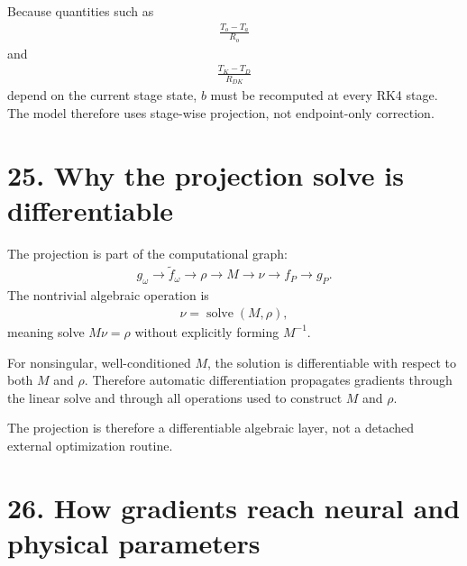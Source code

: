 \documentclass[11pt]{article}
\begin{document}
Because quantities such as
\begin{align}
\frac{T_o-T_a}{R_o}
\end{align}
and
\begin{align}
\frac{T_K-T_D}{R_{DK}}
\end{align}
depend on the current stage state, \(b\) must be recomputed at every RK4 stage. The model therefore uses stage-wise projection, not endpoint-only correction.

\section*{25. Why the projection solve is differentiable}

The projection is part of the computational graph:
\begin{align}
g_\omega\rightarrow\widetilde f_\omega\rightarrow\rho\rightarrow M\rightarrow\nu\rightarrow f_P\rightarrow g_P.
\end{align}
The nontrivial algebraic operation is
\begin{align}
\boxed{\nu=\operatorname{solve}(M,\rho),}
\tag{E5.94}
\end{align}
meaning solve \(M\nu=\rho\) without explicitly forming \(M^{-1}\).

For nonsingular, well-conditioned \(M\), the solution is differentiable with respect to both \(M\) and \(\rho\). Therefore automatic differentiation propagates gradients through the linear solve and through all operations used to construct \(M\) and \(\rho\).

The projection is therefore a differentiable algebraic layer, not a detached external optimization routine.

\section*{26. How gradients reach neural and physical parameters}
\end{document}
